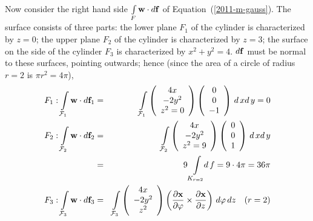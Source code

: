 {\begin{enumerate}
Now consider the right hand side $\int \limits_F {\bf w} \cdot d{\bf f}$
of Equation~(\ref{2011-m-gauss}).
The surface consists of three  parts:
the lower plane $F_1$ of the cylinder is characterized by $z=0$;
the upper plane $F_2$  of the cylinder is characterized by  $z=3$;
the surface on the side of the cylinder $F_3$
 is characterized by   $x^2+y^2=4$.
$d {\bf f}$ must be normal to these surfaces, pointing outwards; hence
(since the area of a circle of radius $r=2$ is $\pi r^2 = 4\pi$),
 \begin{eqnarray*}
  F_1 : \int \limits_{{\cal F}_1} {\bf w} \cdot d{\bf f}_1  & = &
    \int \limits_{{\cal F}_1}
    \left(
      \begin{array}{c}
        4x \\
        -2y^2 \\
        z^2=0
      \end{array}
    \right)
    \left(
      \begin{array}{c}
        0 \\
        0 \\
        -1
      \end{array}
    \right)
    \, d\, x d\, y = 0 \\
  F_2 : \int \limits_{{\cal F}_2} {\bf w} \cdot d{\bf f}_2 & = &
    \int \limits_{{\cal F}_2}
    \left(
      \begin{array}{c}
        4x \\
        -2y^2 \\
        z^2=9
      \end{array}
    \right)
    \left(
      \begin{array}{c}
        0 \\
        0 \\
        1
      \end{array}
    \right)
    \, d\, x d\, y   \\
  & = & 9 \int \limits_{K_{r=2}} \!\! d\, f=9 \cdot 4 \pi=36 \pi \\
  F_3 : \int \limits_{{\cal F}_3} {\bf w} \cdot d{\bf f}_3 & = &
    \int \limits_{{\cal F}_3}
    \left(
      \begin{array}{c}
        4x \\
        -2y^2 \\
        z^2
      \end{array}
    \right)
    \left(
      \frac{\partial {\bf x}}{\partial \varphi} \times
      \frac{\partial {\bf x}}{\partial z}
    \right)
    \, d\varphi \, dz \quad (r=2)
\end{eqnarray*}

\end{enumerate}}
